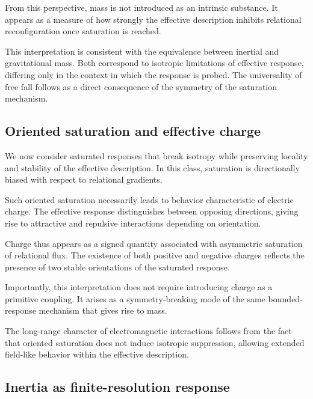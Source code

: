 \documentclass[pdflatex,sn-mathphys-num]{sn-jnl} %
\theoremstyle{remark}
\begin{document}
      From this perspective, mass is not introduced as an intrinsic substance.
      It appears as a measure of how strongly the effective description inhibits
      relational reconfiguration once saturation is reached.

      This interpretation is consistent with the equivalence between inertial and
      gravitational mass.
      Both correspond to isotropic limitations of effective response, differing only
      in the context in which the response is probed.
      The universality of free fall follows as a direct consequence of the symmetry of
      the saturation mechanism.

    \subsection{Oriented saturation and effective charge}
      \label{subsec:oriented}

      We now consider saturated responses that break isotropy while preserving
      locality and stability of the effective description.
      In this class, saturation is directionally biased with respect to relational
      gradients.

      Such oriented saturation necessarily leads to behavior characteristic of
      electric charge.
      The effective response distinguishes between opposing directions, giving rise
      to attractive and repulsive interactions depending on orientation.

      Charge thus appears as a signed quantity associated with asymmetric saturation
      of relational flux.
      The existence of both positive and negative charges reflects the presence of two
      stable orientations of the saturated response.

      Importantly, this interpretation does not require introducing charge as a
      primitive coupling.
      It arises as a symmetry-breaking mode of the same bounded-response mechanism
      that gives rise to mass.

      The long-range character of electromagnetic interactions follows from the fact
      that oriented saturation does not induce isotropic suppression, allowing
      extended field-like behavior within the effective description.

    \subsection{Inertia as finite-resolution response}
      \label{subsec:inertia}
\end{document}
